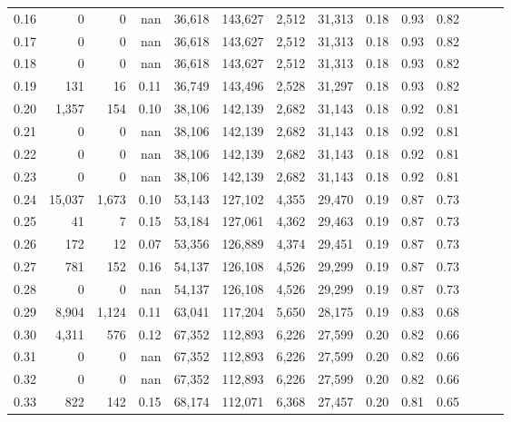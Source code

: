 \begin{tabular}{rrrrrrrrrrrrrr}
0.16 &       0 &      0 &   nan &   36,618 &  143,627 &   2,512 &  31,313 &  0.18 &  0.93 &      0.82 \\
0.17 &       0 &      0 &   nan &   36,618 &  143,627 &   2,512 &  31,313 &  0.18 &  0.93 &      0.82 \\
0.18 &       0 &      0 &   nan &   36,618 &  143,627 &   2,512 &  31,313 &  0.18 &  0.93 &      0.82 \\
0.19 &     131 &     16 &  0.11 &   36,749 &  143,496 &   2,528 &  31,297 &  0.18 &  0.93 &      0.82 \\
0.20 &   1,357 &    154 &  0.10 &   38,106 &  142,139 &   2,682 &  31,143 &  0.18 &  0.92 &      0.81 \\
0.21 &       0 &      0 &   nan &   38,106 &  142,139 &   2,682 &  31,143 &  0.18 &  0.92 &      0.81 \\
0.22 &       0 &      0 &   nan &   38,106 &  142,139 &   2,682 &  31,143 &  0.18 &  0.92 &      0.81 \\
0.23 &       0 &      0 &   nan &   38,106 &  142,139 &   2,682 &  31,143 &  0.18 &  0.92 &      0.81 \\
0.24 &  15,037 &  1,673 &  0.10 &   53,143 &  127,102 &   4,355 &  29,470 &  0.19 &  0.87 &      0.73 \\
0.25 &      41 &      7 &  0.15 &   53,184 &  127,061 &   4,362 &  29,463 &  0.19 &  0.87 &      0.73 \\
0.26 &     172 &     12 &  0.07 &   53,356 &  126,889 &   4,374 &  29,451 &  0.19 &  0.87 &      0.73 \\
0.27 &     781 &    152 &  0.16 &   54,137 &  126,108 &   4,526 &  29,299 &  0.19 &  0.87 &      0.73 \\
0.28 &       0 &      0 &   nan &   54,137 &  126,108 &   4,526 &  29,299 &  0.19 &  0.87 &      0.73 \\
0.29 &   8,904 &  1,124 &  0.11 &   63,041 &  117,204 &   5,650 &  28,175 &  0.19 &  0.83 &      0.68 \\
0.30 &   4,311 &    576 &  0.12 &   67,352 &  112,893 &   6,226 &  27,599 &  0.20 &  0.82 &      0.66 \\
0.31 &       0 &      0 &   nan &   67,352 &  112,893 &   6,226 &  27,599 &  0.20 &  0.82 &      0.66 \\
0.32 &       0 &      0 &   nan &   67,352 &  112,893 &   6,226 &  27,599 &  0.20 &  0.82 &      0.66 \\
0.33 &     822 &    142 &  0.15 &   68,174 &  112,071 &   6,368 &  27,457 &  0.20 &  0.81 &      0.65 \\

\end{tabular}
